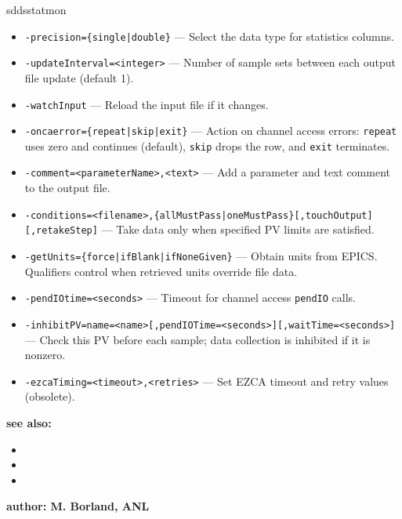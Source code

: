 \begin{sddsprog}{sddsstatmon}
\begin{itemize}
        \item {\tt -precision=\{single|double\}} --- Select the data type for statistics columns.
        \item {\tt -updateInterval=<integer>} --- Number of sample sets between each output file update (default 1).
        \item {\tt -watchInput} --- Reload the input file if it changes.
        \item {\tt -oncaerror=\{repeat|skip|exit\}} --- Action on channel access errors: \verb+repeat+ uses zero and continues (default), \verb+skip+ drops the row, and \verb+exit+ terminates.
        \item {\tt -comment=<parameterName>,<text>} --- Add a parameter and text comment to the output file.
        \item {\tt -conditions=<filename>,\{allMustPass|oneMustPass\}[,touchOutput][,retakeStep]} --- Take data only when specified PV limits are satisfied.
        \item {\tt -getUnits=\{force|ifBlank|ifNoneGiven\}} --- Obtain units from EPICS. Qualifiers control when retrieved units override file data.
        \item {\tt -pendIOtime=<seconds>} --- Timeout for channel access \verb+pendIO+ calls.
        \item {\tt -inhibitPV=name=<name>[,pendIOTime=<seconds>][,waitTime=<seconds>]} --- Check this PV before each sample; data collection is inhibited if it is nonzero.
        \item {\tt -ezcaTiming=<timeout>,<retries>} --- Set EZCA timeout and retry values (obsolete).
    \end{itemize}

\item {\bf see also:}
    \begin{itemize}
    \item {}
    \item {}
    \item {}
    \end{itemize}
\item {\bf author: M. Borland, ANL} 
\end{sddsprog}
